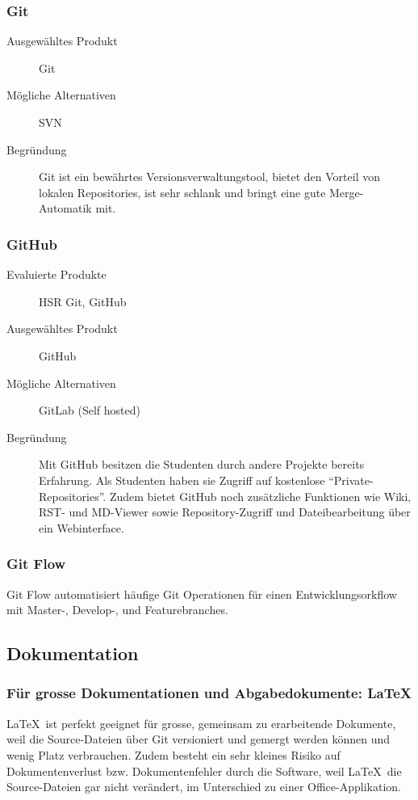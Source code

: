 			\subsubsection{Git}
				\begin{description}
					\item[Ausgewähltes Produkt] Git
					\item[Mögliche Alternativen] SVN
					\item[Begründung] Git ist ein bewährtes Versionsverwaltungstool, bietet den Vorteil von lokalen Repositories, ist sehr schlank und bringt eine gute Merge-Automatik mit.
				\end{description}

			\subsubsection{GitHub}
				\begin{description}
					\item[Evaluierte Produkte] HSR Git, GitHub
					\item[Ausgewähltes Produkt] GitHub
					\item[Mögliche Alternativen] GitLab (Self hosted)
					\item[Begründung] Mit GitHub besitzen die Studenten durch andere Projekte bereits Erfahrung. 
						Als Studenten haben sie Zugriff auf kostenlose "`Private-Repositories"'. 
						Zudem bietet GitHub noch zusätzliche Funktionen wie Wiki, RST- und MD-Viewer sowie
						Repository-Zugriff und Dateibearbeitung über ein Webinterface.
				\end{description}
				
			\subsubsection{Git Flow}
				Git Flow automatisiert häufige Git Operationen für einen Entwicklungsorkflow mit Master-, Develop-, und Featurebranches.

		\subsection{Dokumentation}
			\subsubsection{Für grosse Dokumentationen und Abgabedokumente: \LaTeX}
				\LaTeX\ ist perfekt geeignet für grosse, gemeinsam zu erarbeitende Dokumente,
				weil die Source-Dateien über Git versioniert und gemergt werden können und wenig
				Platz verbrauchen. 
				Zudem besteht ein sehr kleines Risiko auf Dokumentenverlust
				bzw. Dokumentenfehler durch die Software, weil \LaTeX\ die Source-Dateien gar
				nicht verändert, im Unterschied zu einer Office-Applikation.
				
